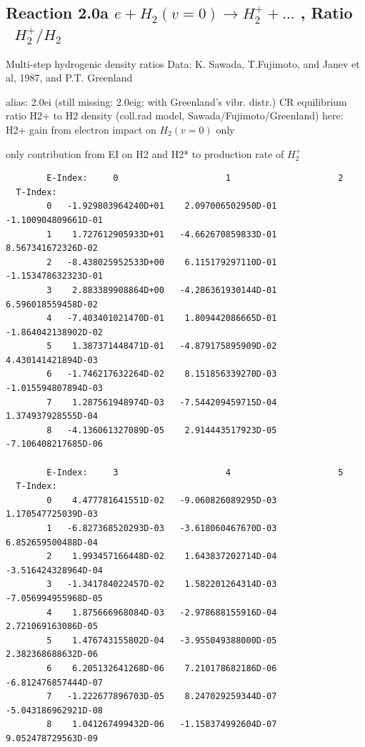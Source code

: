 \documentclass[12pt,dvipdfmx]{article}
\begin{document}
\subsection{
Reaction 2.0a  $e + H_2(v=0) \rightarrow H_2^+ + ... $ , Ratio \ $H_2^+/H_2$
}

 Multi-step hydrogenic density ratios
 Data: K. Sawada, T.Fujimoto, \cite{kn:Sawada} and Janev et al, 1987, and P.T. Greenland

alias: 2.0ei  (still missing: 2.0eig: with Greenland's vibr. distr.)
  CR equilibrium ratio H2+ to H2 density
  (coll.rad model, Sawada/Fujimoto/Greenland)
 here:  H2+ gain from electron impact on $H_2(v=0)$ only

  only contribution from  EI on H2 and H2* to production rate of $H_2^+$


\begin{small}\begin{verbatim}
        E-Index:     0                     1                     2
  T-Index:
        0   -1.929803964240D+01    2.097006502950D-01   -1.100904809661D-01
        1    1.727612905933D+01   -4.662670859833D-01    8.567341672326D-02
        2   -8.438025952533D+00    6.115179297110D-01   -1.153478632323D-01
        3    2.883389908864D+00   -4.286361930144D-01    6.596018559458D-02
        4   -7.403401021470D-01    1.809442086665D-01   -1.864042138902D-02
        5    1.387371448471D-01   -4.879175895909D-02    4.430141421894D-03
        6   -1.746217632264D-02    8.151856339270D-03   -1.015594807894D-03
        7    1.287561948974D-03   -7.544209459715D-04    1.374937928555D-04
        8   -4.136061327089D-05    2.914443517923D-05   -7.106408217685D-06

        E-Index:     3                     4                     5
  T-Index:
        0    4.477781641551D-02   -9.060826089295D-03    1.170547725039D-03
        1   -6.827368520293D-03   -3.618060467670D-03    6.852659500488D-04
        2    1.993457166448D-02    1.643837202714D-04   -3.516424328964D-04
        3   -1.341784022457D-02    1.582201264314D-03   -7.056994955968D-05
        4    1.875666968084D-03   -2.978688155916D-04    2.721069163086D-05
        5    1.476743155802D-04   -3.955049388000D-05    2.382368688632D-06
        6    6.205132641268D-06    7.210178682186D-06   -6.812476857444D-07
        7   -1.222677896703D-05    8.247029259344D-07   -5.043186962921D-08
        8    1.041267499432D-06   -1.158374992604D-07    9.052478729563D-09


\end{verbatim}
\end{small}
\end{document}
